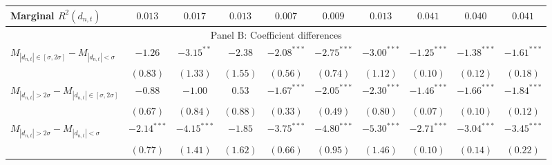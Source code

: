 \begin{tabular}{lccccccccc}
  Marginal $R^2(d_{n,t})$ & $0.013$ & $0.017$ & $0.013$ & $0.007$ & $0.009$ & $0.013$ & $0.041$ & $0.040$ & $0.041$ \\ 
   \hline \multicolumn{10}{c}{Panel B: Coefficient differences} \\
 \hline$M_{|d_{n,t}| \in [\sigma, 2\sigma]} - M_{|d_{n,t}| < \sigma}$ & $-1.26$ & $-3.15^{**}$ & $-2.38$ & $-2.08^{***}$ & $-2.75^{***}$ & $-3.00^{***}$ & $-1.25^{***}$ & $-1.38^{***}$ & $-1.61^{***}$ \\ 
   & $(0.83)$ & $(1.33)$ & $(1.55)$ & $(0.56)$ & $(0.74)$ & $(1.12)$ & $(0.10)$ & $(0.12)$ & $(0.18)$ \\ 
  $M_{|d_{n,t}| > 2 \sigma} - M_{|d_{n,t}| \in [\sigma, 2\sigma]}$ & $-0.88$ & $-1.00$ & $0.53$ & $-1.67^{***}$ & $-2.05^{***}$ & $-2.30^{***}$ & $-1.46^{***}$ & $-1.66^{***}$ & $-1.84^{***}$ \\ 
   & $(0.67)$ & $(0.84)$ & $(0.88)$ & $(0.33)$ & $(0.49)$ & $(0.80)$ & $(0.07)$ & $(0.10)$ & $(0.12)$ \\ 
  $M_{|d_{n,t}| > 2 \sigma} - M_{|d_{n,t}| < \sigma}$ & $-2.14^{***}$ & $-4.15^{***}$ & $-1.85$ & $-3.75^{***}$ & $-4.80^{***}$ & $-5.30^{***}$ & $-2.71^{***}$ & $-3.04^{***}$ & $-3.45^{***}$ \\ 
   & $(0.77)$ & $(1.41)$ & $(1.62)$ & $(0.66)$ & $(0.95)$ & $(1.46)$ & $(0.10)$ & $(0.14)$ & $(0.22)$ \\ 
   \hline 
\end{tabular}

